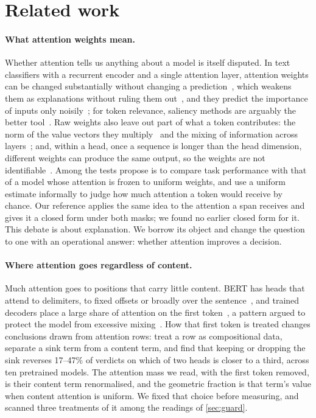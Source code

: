 \documentclass[11pt,a4paper]{article}
\begin{document}
\section{Related work}
\label{sec:related}

\paragraph{What attention weights mean.} Whether attention tells us anything about a model is itself disputed. In text classifiers with a
recurrent encoder and a single attention layer, attention weights can be changed substantially without changing a
prediction~\citep{jain-wallace-2019-attention}, which weakens them as explanations without ruling them
out~\citep{wiegreffe-pinter-2019-attention}, and they predict the importance of inputs only noisily~\citep{serrano2019attention}; for token relevance, saliency methods are arguably the better
tool~\citep{bastings2020elephant}. Raw weights also leave out part of what a token contributes: the norm of the value vectors
they multiply~\citep{kobayashi2020attention} and the mixing of information across layers~\citep{abnar2020quantifying}; and,
within a head, once a sequence is longer than the head dimension, different weights can produce the same output, so the
weights are not identifiable~\citep{brunner2020identifiability}. Among the tests \citet{wiegreffe-pinter-2019-attention} propose is to compare task performance with that of a model whose attention is frozen to uniform weights, and \citet{clark2019bert} use a
uniform estimate informally to judge how much attention a token would receive by chance. Our reference applies the same idea
to the attention a span receives and gives it a closed form under both masks; we found no earlier closed form for it. This debate is about
explanation. We borrow its object and change the question to one with an operational answer: whether attention improves a
decision.

\paragraph{Where attention goes regardless of content.} Much attention goes to positions that carry little content. BERT has
heads that attend to delimiters, to fixed offsets or broadly over the sentence~\citep{clark2019bert}, and trained decoders
place a large share of attention on the first token~\citep{xiao2023sinks,gu2024sink}, a pattern argued to protect the model
from excessive mixing~\citep{barbero2025first}. How that first token is treated changes conclusions drawn from attention
rows: \citet{papamichalis2026attentionrows} treat a row as compositional data, separate a sink term from a content term,
and find that keeping or dropping the sink reverses 17--47\% of verdicts on which of two heads is closer to a third, across
ten pretrained models. The attention mass we read, with the first token removed, is their content term renormalised, and the
geometric fraction is that term's value when content attention is uniform. We fixed that choice before
measuring, and scanned three treatments of it among the readings of \cref{sec:guard}.
\end{document}
